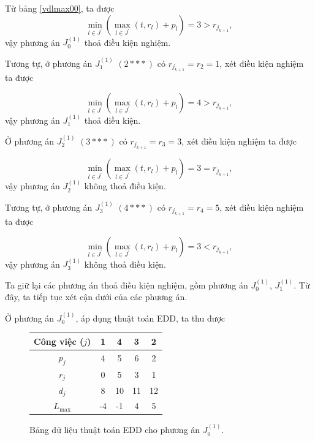 \begin{vd}
Từ bảng \eqref{vdlmax00}, ta được
\begin{equation*}
\underset{l \in J^{'}}{\min} (\underset{l \in J^{'}}{\max} (t, r_l) + p_l) = 3 > r_{j_{k+1}},
\end{equation*}
vậy phương án $J_0^{(1)}$ thoả điều kiện nghiệm.

Tương tự, ở phương án $J_1^{(1)}$ $(2***)$ có $r_{j_{k+1}} = r_2 = 1$, xét điều kiện nghiệm ta được

\begin{equation*}
\underset{l \in J^{'}}{\min} (\underset{l \in J^{'}}{\max} (t, r_l) + p_l) = 4 > r_{j_{k+1}},
\end{equation*}
vậy phương án $J_1^{(1)}$ thoả điều kiện.


Ở phương án $J_2^{(1)}$ $(3***)$ có $r_{j_{k+1}} = r_3 = 3$, xét điều kiện nghiệm ta được

\begin{equation*}
\underset{l \in J^{'}}{\min} (\underset{l \in J^{'}}{\max} (t, r_l) + p_l) = 3 = r_{j_{k+1}},
\end{equation*}
vậy phương án $J_2^{(1)}$ không thoả điều kiện.

Tương tự, ở phương án $J_3^{(1)}$ $(4***)$ có $r_{j_{k+1}} = r_4 = 5$, xét điều kiện nghiệm ta được

\begin{equation*}
\underset{l \in J^{'}}{\min} (\underset{l \in J^{'}}{\max} (t, r_l) + p_l) = 3 < r_{j_{k+1}},
\end{equation*}
vậy phương án $J_3^{(1)}$ không thoả điều kiện.

Ta giữ lại các phương án thoả điều kiện nghiệm, gồm phương án $J_0^{(1)}$, $J_1^{(1)}$. Từ đây, ta tiếp tục xét cận dưới của các phương án.

Ở phương án $J_0^{(1)}$, áp dụng thuật toán EDD, ta thu được

\begin{figure}[h!]
	\centering
	\begin{tabular}{|c | c c c c |} 
	\hline
	Công việc ($j$) & 1 & 4 & 3 & 2 \\
	\hline\hline
	$p_j$ & 4 & 5 & 6 & 2 \\
	$r_j$ & 0 & 5 & 3 & 1 \\
	$d_j$ & 8 & 10 & 11 & 12 \\
	$L_{\max}$ & -4 & -1 & 4 & 5 \\ 
	\hline
	\end{tabular}
\caption{\label{eddj01} Bảng dữ liệu thuật toán EDD cho phương án $J_0^{(1)}$.}
\end{figure}


\end{vd}
